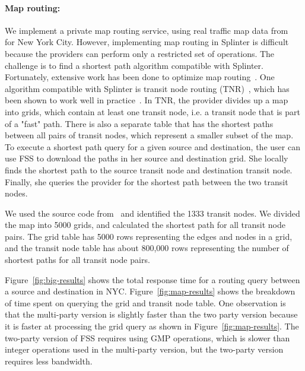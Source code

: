 \paragraph{Map routing:}
We implement a private map routing service, using real traffic map data from~\cite{dimacs} for New York City.
However, implementing map routing in Splinter is difficult because the providers can
perform only a restricted set of operations. The challenge is to find a shortest path 
algorithm compatible with Splinter. Fortunately,
extensive work has been done to optimize map routing~\cite{bast2015route}.
One algorithm compatible with Splinter is transit node routing 
(TNR)~\cite{tnr, bast2007fast}, which has been
shown to work well in practice~\cite{bast2009ultrafast}. 
In TNR, the provider divides up a map into grids, 
which contain at least one transit node, i.e. a transit node 
that is part of a "fast" path. There is also a separate table
that has the shortest paths between all pairs of transit nodes, which 
represent a smaller subset of the map. To execute a shortest path query for a given
source and destination, the user can use FSS to download the paths
in her source and destination grid. She locally finds the shortest path to the source transit node
and destination transit node. Finally, she queries the provider for the shortest path
between the two transit nodes.

We used the source code from~\cite{tnr} and identified the 1333 transit nodes. We divided the map into 5000 grids,
and calculated the shortest path for all transit node pairs. The grid table has 5000 rows
representing the edges and nodes in a grid, and the transit node table has about 800,000
rows representing the number of shortest paths for all transit node pairs. 

Figure~\ref{fig:big-results} shows the total response time for a routing query
between a source and destination in NYC. Figure~\ref{fig:map-results} shows
the breakdown of time spent on querying the grid and transit node table.
One observation is that the multi-party version is slightly faster than the two party
version because it is faster at processing the grid query as shown in Figure~\ref{fig:map-results}.
The two-party version of FSS requires using GMP operations, which is slower than integer operations
used in the multi-party version, but the two-party version requires less bandwidth.

